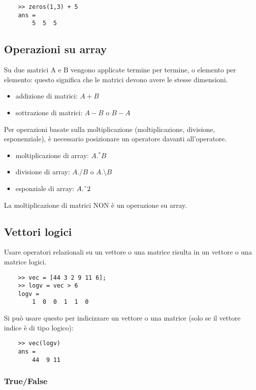 \documentclass[a4paper, 10pt]{article}
\begin{document}
\begin{lstlisting}
	>> zeros(1,3) + 5
	ans =
		5  5  5
\end{lstlisting}

\subsection{Operazioni su array}

Su due matrici A e B vengono applicate termine per termine, o elemento per elemento: questo significa  che le matrici devono avere le stesse dimensioni.
\begin{itemize}
\item addizione di matrici: $A+B$
\item sottrazione di matrici: $A-B$ o $B-A$
\end{itemize}

Per operazioni basate sulla moltiplicazione (moltiplicazione, divisione, esponenziale), è necessario posizionare un operatore davanti all'operatore.

\begin{itemize}
\item moltiplicazione di array: $A.^{*} B$
\item divisione di array: $A./B$ o $A.\setminus B$
\item esponziale di array:  $A. \char`\^ 2$ 
\end{itemize}
La moltiplicazione di matrici NON è un operazione su array.

\subsection{Vettori logici}
Usare operatori relazionali su un vettore o una matrice risulta in un vettore o una matrice logici.

\begin{lstlisting}
	>> vec = [44 3 2 9 11 6];
	>> logv = vec > 6
	logv =
		1  0  0  1  1  0
\end{lstlisting}
Si può usare questo per indicizzare un vettore o una matrice (solo se il vettore indice è di tipo logico):

\begin{lstlisting}
	>> vec(logv)
	ans =
		44  9 11
\end{lstlisting}

\subsubsection{True/False}
\end{document}
